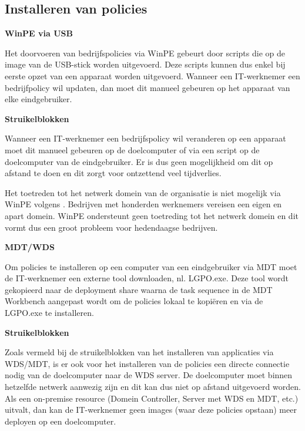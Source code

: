 \subsection{Installeren van policies}



\textbf{WinPE via USB}

Het doorvoeren van bedrijfspolicies via WinPE gebeurt door scripts die op de image van de USB-stick worden uitgevoerd. Deze scripts kunnen dus enkel bij eerste opzet van een apparaat worden uitgevoerd. Wanneer een IT-werknemer een bedrijfpolicy wil updaten, dan moet dit manueel gebeuren op het apparaat van elke eindgebruiker.



\textbf{Struikelblokken}

Wanneer een IT-werknemer een bedrijfspolicy wil veranderen op een apparaat moet dit manueel gebeuren op de doelcomputer of via een script op de doelcomputer van de eindgebruiker. Er is dus geen mogelijkheid om dit op afstand te doen en dit zorgt voor ontzettend veel tijdverlies.

Het toetreden tot het netwerk domein van de organisatie is niet mogelijk via WinPE volgens \textcite{tedhudek2021}. Bedrijven met honderden werknemers vereisen een eigen en apart domein. WinPE ondersteunt geen toetreding tot het netwerk domein en dit vormt dus een groot probleem voor hedendaagse bedrijven. \autocite{EliotSeattle2021}



\textbf{MDT/WDS}

Om policies te installeren op een computer van een eindgebruiker via MDT moet de IT-werknemer een externe tool downloaden, nl. LGPO.exe. Deze tool wordt gekopieerd naar de deployment share waarna de task sequence in de MDT Workbench aangepast wordt om de policies lokaal te kopiëren en via de LGPO.exe te installeren.\autocite{Arwidmark2016}


\textbf{Struikelblokken}

Zoals vermeld bij de struikelblokken van het installeren van applicaties via WDS/MDT, is er ook voor het installeren van de policies een directe connectie nodig van de doelcomputer naar de WDS server. De doelcomputer moet binnen hetzelfde netwerk aanwezig zijn en dit kan dus niet op afstand uitgevoerd worden. Als een on-premise resource (Domein Controller, Server met WDS en MDT, etc.) uitvalt, dan kan de IT-werknemer geen images (waar deze policies opstaan) meer deployen op een doelcomputer.


